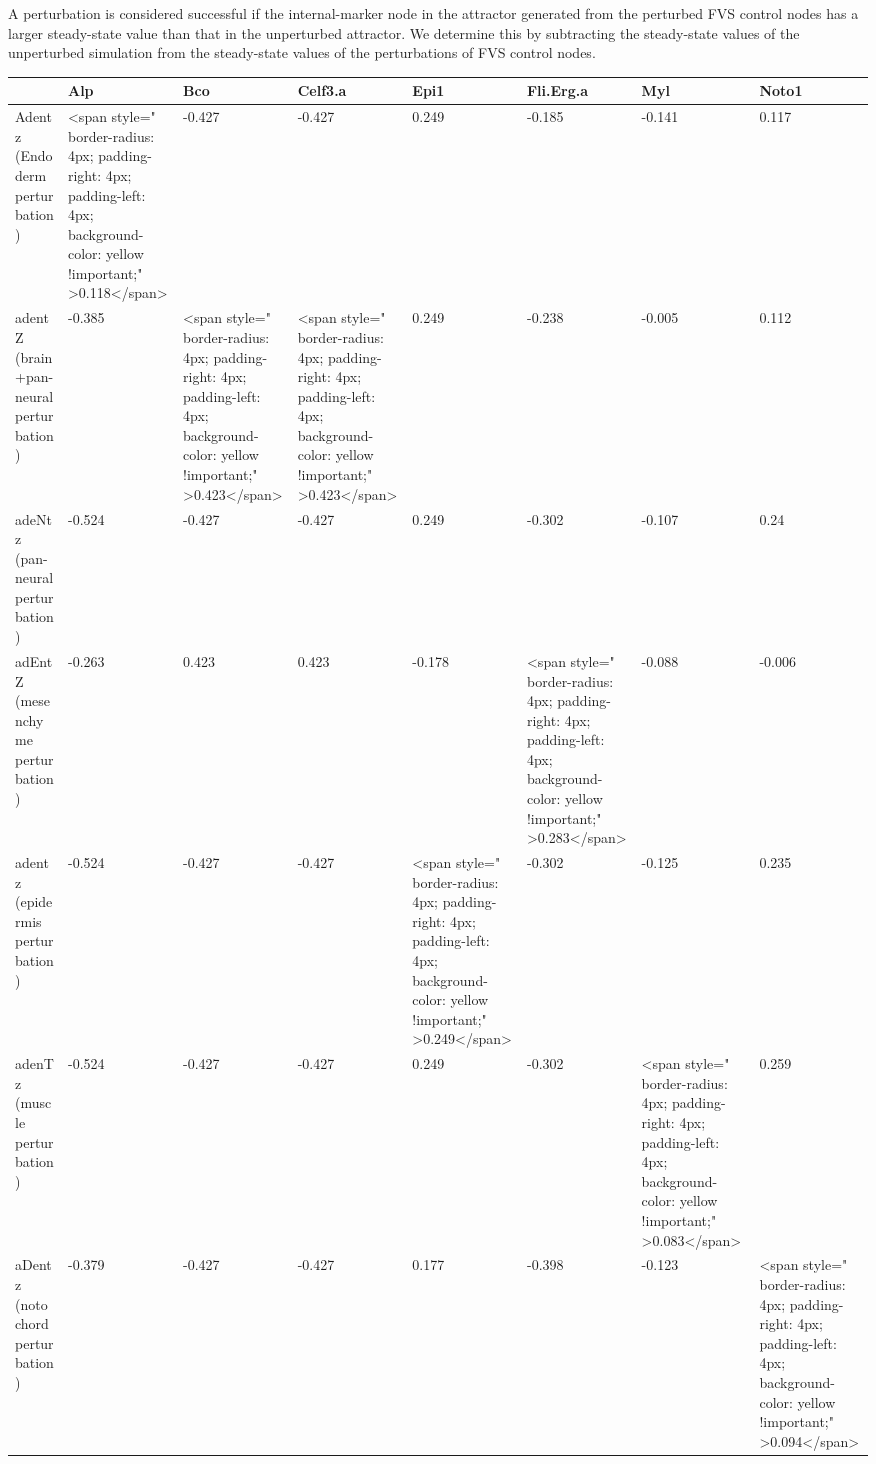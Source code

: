 \documentclass[
]{book}
\begin{document}
A perturbation is considered successful if the internal-marker node in the attractor generated from the perturbed FVS control nodes has a larger steady-state value than that in the unperturbed attractor. We determine this by subtracting the steady-state values of the unperturbed simulation from the steady-state values of the perturbations of FVS control nodes.

\begin{table}
\centering\begingroup\fontsize{9}{11}\selectfont

\begin{tabular}{l|l|l|l|l|l|l|l}
\hline
  & Alp & Bco & Celf3.a & Epi1 & Fli.Erg.a & Myl & Noto1\\
\hline
Adentz (Endoderm perturbation) & <span style="     border-radius: 4px; padding-right: 4px; padding-left: 4px; background-color: yellow !important;" >0.118</span> & -0.427 & -0.427 & 0.249 & -0.185 & -0.141 & 0.117\\
\hline
adentZ (brain+pan-neural perturbation) & -0.385 & <span style="     border-radius: 4px; padding-right: 4px; padding-left: 4px; background-color: yellow !important;" >0.423</span> & <span style="     border-radius: 4px; padding-right: 4px; padding-left: 4px; background-color: yellow !important;" >0.423</span> & 0.249 & -0.238 & -0.005 & 0.112\\
\hline
adeNtz (pan-neural perturbation) & -0.524 & -0.427 & -0.427 & 0.249 & -0.302 & -0.107 & 0.24\\
\hline
adEntZ (mesenchyme perturbation) & -0.263 & 0.423 & 0.423 & -0.178 & <span style="     border-radius: 4px; padding-right: 4px; padding-left: 4px; background-color: yellow !important;" >0.283</span> & -0.088 & -0.006\\
\hline
adentz (epidermis perturbation) & -0.524 & -0.427 & -0.427 & <span style="     border-radius: 4px; padding-right: 4px; padding-left: 4px; background-color: yellow !important;" >0.249</span> & -0.302 & -0.125 & 0.235\\
\hline
adenTz (muscle perturbation) & -0.524 & -0.427 & -0.427 & 0.249 & -0.302 & <span style="     border-radius: 4px; padding-right: 4px; padding-left: 4px; background-color: yellow !important;" >0.083</span> & 0.259\\
\hline
aDentz (notochord perturbation) & -0.379 & -0.427 & -0.427 & 0.177 & -0.398 & -0.123 & <span style="     border-radius: 4px; padding-right: 4px; padding-left: 4px; background-color: yellow !important;" >0.094</span>\\
\hline
\end{tabular}
\endgroup{}
\end{table}
\end{document}
